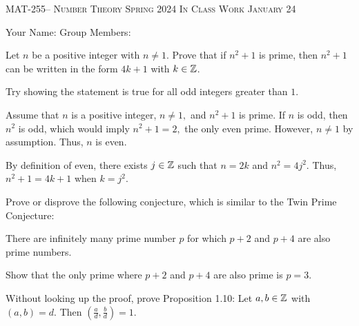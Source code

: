 \documentclass[handout]{ximera}
\date{January 24, 2024}
\begin{document}
\handoutAbstract
\maketitle
    \begin{center}%
        {\large \scshape MAT-255-- Number Theory \hfill Spring 2024 \hfill In Class Work January 24}%
    
        {\large
            Your Name: \hrulefill \quad Group Members:\hrulefill \quad \hrulefill
	    \par}%
    \end{center}%


  
\begin{br}
    Let $n$ be a positive integer with $n\neq 1$. Prove that if $n^2+1$ is prime, then $n^2+1$ can be written in the form $4k+1$ with $k\in\mathbb Z$.


    \begin{hint}
        Try showing the statement is true for all odd integers greater than $1.$
    \end{hint}

    \begin{solution}
        Assume that $n$ is a positive integer, $n\neq 1,$ and $n^2+1$ is prime. If $n$ is odd, then $n^2$ is odd, which would imply $n^2+1=2,$ the only even prime. However, $n\neq 1$ by assumption. Thus, $n$ is even. 

        By definition of even, there exists $j\in\mathbb Z$ such that $n=2k$ and $n^2=4j^2$. Thus, $n^2+1=4k+1$ when $k=j^2.$
    \end{solution}
\end{br}

\pdfOnly{\ifhandout{
    \vfill
    \vfill}
    \else
    \fi}

\begin{br}
    Prove or disprove the following conjecture, which is similar to the Twin Prime Conjecture:
    \begin{conjecture}
        There are infinitely many prime number $p$ for which $p+2$ and $p+4$ are also prime numbers.
    \end{conjecture}


    \begin{hint}
        Show that the only prime where $p+2$ and $p+4$ are also prime is $p=3.$ 
    \end{hint}


    \pdfOnly{\ifhandout{
        \vfill}
        \else
        \fi}
\end{br}

 
\begin{br}
    Without looking up the proof, prove 
    Proposition 1.10:
    Let $a, b\in \mathbb Z$ with $(a,b)=d.$ Then $\left(\frac{a}{d},\frac{b}{d}\right)=1.$
\end{br}
\end{document}
